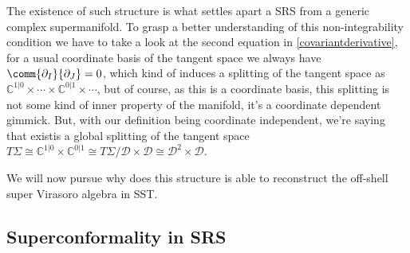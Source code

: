 The existence of such structure is what settles apart a SRS from a generic complex supermanifold. 
To grasp a better understanding of this non-integrability condition we have to take a look at the 
second equation in \eqref{covariantderivative}, for a usual coordinate basis of the tangent space 
we always have $\comm{\partial_I}{\partial_J}=0$, which kind of induces a splitting of the 
tangent space as $\mathbb C^{1|0}\times\cdots\times\mathbb C^{0|1}\times\cdots$, but of course, 
as this is a coordinate basis, this splitting is not some kind of inner property of the manifold, 
it's a coordinate dependent gimmick. But, with our definition being coordinate independent, 
we're saying that existis a global splitting of the tangent space $T\Sigma\cong \mathbb C^{1|0}\times \mathbb C^{0|1}\cong T\Sigma/\mathcal D\times \mathcal D\cong \mathcal D ^2\times\mathcal D$.

We will now pursue 
why does this structure is able to reconstruct the off-shell super Virasoro algebra in SST.

\subsection{Superconformality in SRS}

